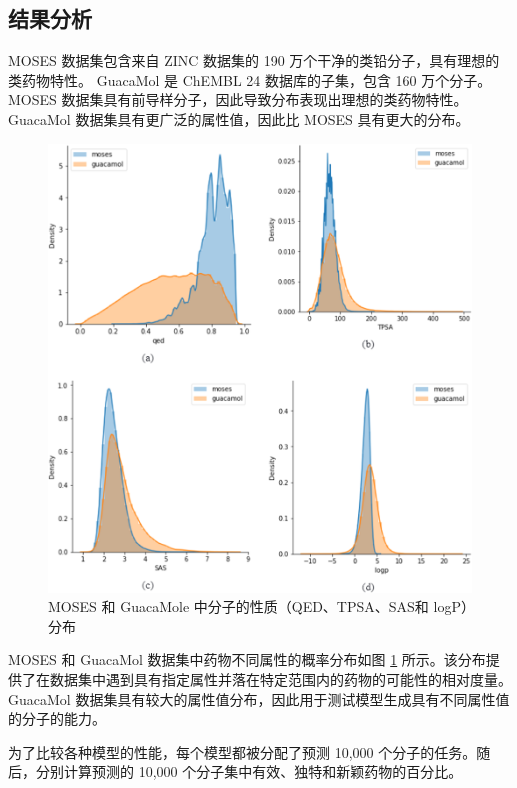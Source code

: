 \begin{translation}
\subsection{结果分析}

MOSES 数据集包含来自 ZINC 数据集的 190 万个干净的类铅分子，具有理想的类药物特性。 GuacaMol 是 ChEMBL 24 数据库的子集，包含 160 万个分子。 MOSES 数据集具有前导样分子，因此导致分布表现出理想的类药物特性。 GuacaMol 数据集具有更广泛的属性值，因此比 MOSES 具有更大的分布。

\begin{figure}[H]
  \centering
  \includegraphics[width=\linewidth]{figures/2.png}
  \caption{MOSES 和 GuacaMole 中分子的性质（QED、TPSA、SAS和 logP）分布}
  \label{fig:2}
\end{figure}

MOSES 和 GuacaMol 数据集中药物不同属性的概率分布如图 \ref{fig:2} 所示。该分布提供了在数据集中遇到具有指定属性并落在特定范围内的药物的可能性的相对度量。 GuacaMol 数据集具有较大的属性值分布，因此用于测试模型生成具有不同属性值的分子的能力。

为了比较各种模型的性能，每个模型都被分配了预测 10,000 个分子的任务。随后，分别计算预测的 10,000 个分子集中有效、独特和新颖药物的百分比。


\end{translation}
